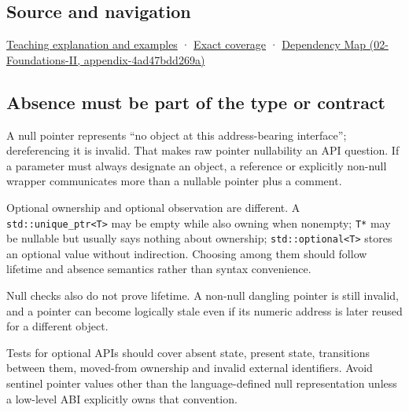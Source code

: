 \subsection{Source and navigation}\label{appendix-afae48c31800-source-and-navigation}

\hyperref[01-foundations-i-ch003-a-pointer-carries-an-access-contract]{Teaching explanation and examples} · \hyperref[appendix-fd090d982a15-m008---parts-113-126]{Exact coverage} · \href{../02-Foundations-II/main.pdf\#nameddest=appendix-4ad47bdd269a}{Dependency Map (02-Foundations-II, appendix-4ad47bdd269a)}

\subsection{Absence must be part of the type or contract}\label{appendix-afae48c31800-absence-must-be-part-of-the-type-or-contract}

A null pointer represents ``no object at this address-bearing interface''; dereferencing it is invalid. That makes raw pointer nullability an API question. If a parameter must always designate an object, a reference or explicitly non-null wrapper communicates more than a nullable pointer plus a comment.

Optional ownership and optional observation are different. A \texttt{std::unique\_ptr\textless{}T\textgreater{}} may be empty while also owning when nonempty; \texttt{T*} may be nullable but usually says nothing about ownership; \texttt{std::optional\textless{}T\textgreater{}} stores an optional value without indirection. Choosing among them should follow lifetime and absence semantics rather than syntax convenience.

Null checks also do not prove lifetime. A non-null dangling pointer is still invalid, and a pointer can become logically stale even if its numeric address is later reused for a different object.

Tests for optional APIs should cover absent state, present state, transitions between them, moved-from ownership and invalid external identifiers. Avoid sentinel pointer values other than the language-defined null representation unless a low-level ABI explicitly owns that convention.
